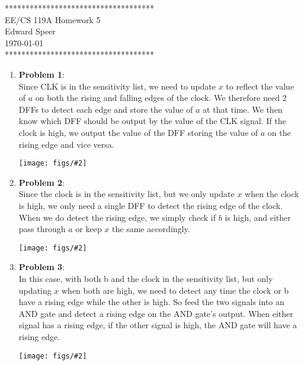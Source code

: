 \documentclass{article}
\newcommand{\HWNUM}{5}
\newcommand{\fig}[2]{
    \begin{center}
        \texttt{[image: figs/\#2]}
    \end{center}
}
\begin{document}

    \begin{center}
        ************************************ \\
        EE/CS 119A Homework \HWNUM \\
        Edward Speer \\
        \today \\
        ************************************
    \end{center}

    \begin{enumerate}
    
        \item \textbf{Problem 1}: \\
            Since CLK is in the sensitivity list, we need to update $x$ to
            reflect the value of $a$ on both the rising and falling edges of 
            the clock. We therefore need 2 DFFs to detect each edge and store
            the value of $a$ at that time. We then know which DFF should be
            output by the value of the CLK signal. If the clock is high, we
            output the value of the DFF storing the value of $a$ on the rising
            edge and vice versa.
            \fig{.4}{p1.jpg}

        \item \textbf{Problem 2}: \\
            Since the clock is in the sensitivity list, but we only update $x$
            when the clock is high, we only need a single DFF to detect the
            rising edge of the clock. When we do detect the rising edge, we
            simply check if $b$ is high, and either pass through $a$ or keep $x$
            the same accordingly.
            \fig{.5}{p2.jpg}

        \pagebreak
        \item \textbf{Problem 3}: \\
            In this case, with both b and the clock in the sensitivity list, but
            only updating $x$ when both are high, we need to detect any time the
            clock or b have a rising edge while the other is high. So feed the
            two signals into an AND gate and detect a rising edge on the AND
            gate's output. When either signal has a rising edge, if the other
            signal is high, the AND gate will have a rising edge.
            \fig{.4}{p3.jpg}


\end{enumerate}
\end{document}

